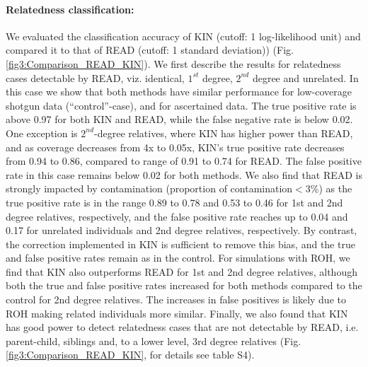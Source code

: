 \documentclass[12pt, letterpaper]{article}
\begin{document}
\paragraph{Relatedness classification:}
We evaluated the classification accuracy of KIN (cutoff: 1 log-likelihood unit) and compared it to that of READ (cutoff: 1 standard deviation)) (Fig. \ref{fig3:Comparison_READ_KIN}). We first describe the results for relatedness cases detectable by READ, viz. identical, $1^{st}$ degree, $2^{nd}$ degree and unrelated. In this case we show that both methods have similar performance for low-coverage shotgun data (``control''-case), and for ascertained data. The true positive rate is above 0.97 for both KIN and READ, while the false negative rate is below 0.02.  One exception is  $2^{nd}$-degree relatives, where KIN has higher power than READ, and as coverage decreases from 4x to 0.05x, KIN's true positive rate decreases from 0.94 to 0.86, compared to range of 0.91 to 0.74 for READ. The false positive rate in this case remains below 0.02 for both methods. We also find that READ is strongly impacted by contamination (proportion of contamination$<3\%$) as the true positive rate is in the range 0.89 to 0.78 and 0.53 to 0.46 for 1st and 2nd degree relatives, respectively, and the false positive rate reaches up to 0.04 and 0.17 for unrelated individuals and 2nd degree relatives, respectively. By contrast, the correction implemented in KIN is sufficient to remove this bias, and the true and false positive rates remain as in the control. For simulations with ROH, we find that KIN also outperforms READ for 1st and 2nd degree relatives, although both the true and false positive rates increased for both methods compared to the control for 2nd degree relatives. The increases in false positives is likely due to ROH making related individuals more similar. Finally, we also found that KIN has good power to detect relatedness cases that are not detectable by READ, i.e. parent-child, siblings and, to a lower level, 3rd degree relatives (Fig. \ref{fig3:Comparison_READ_KIN}, for details see table S4).
\end{document}

